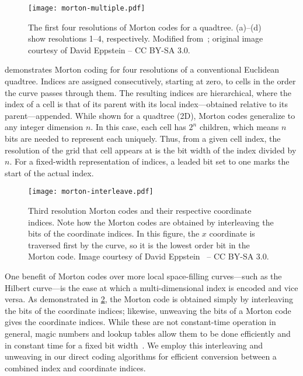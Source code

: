 \begin{figure}[ht!]
	\centering
	\texttt{[image: morton-multiple.pdf]}
	\caption[Four resolutions of Morton codes]{
		The first four resolutions of Morton codes for a quadtree.
		(a)--(d) show resolutions 1--4, respectively.
		Modified from~\cite{morton-multiple}; original image courtesy of David Eppstein -- CC BY-SA 3.0.
	}
	\label{fig:morton-multiple}
\end{figure}


 demonstrates Morton coding for four resolutions of a conventional Euclidean quadtree.
Indices are assigned consecutively, starting at zero, to cells in the order the curve passes through them.
The resulting indices are hierarchical, where the index of a cell is that of its parent with its local index---obtained relative to its parent---appended.
While shown for a quadtree (2D), Morton codes generalize to any integer dimension $n$.
In this case, each cell has $2^n$ children, which means $n$ bits are needed to represent each uniquely.
Thus, from a given cell index, the resolution of the grid that cell appears at is the bit width of the index divided by $n$.
For a fixed-width representation of indices, a leaded bit set to one marks the start of the actual index.


\begin{figure}[htp!]
	\centering
	\texttt{[image: morton-interleave.pdf]}
	\caption[Morton codes by bit-interleaving]{
		Third resolution Morton codes and their respective coordinate indices.
		Note how the Morton codes are obtained by interleaving the bits of the coordinate indices.
		In this figure, the $x$ coordinate is traversed first by the curve, so it is the lowest order bit in the Morton code.
		Image courtesy of David Eppstein~\cite{morton-interleave} -- CC BY-SA 3.0.
	}
	\label{fig:morton-interleave}
\end{figure}


One benefit of Morton codes over more local space-filling curves---such as the Hilbert curve---is the ease at which a multi-dimensional index is encoded and vice versa.
As demonstrated in \cref{fig:morton-interleave}, the Morton code is obtained simply by interleaving the bits of the coordinate indices; likewise, unweaving the bits of a Morton code gives the coordinate indices.
While these are not constant-time operation in general, magic numbers and lookup tables allow them to be done efficiently and in constant time for a fixed bit width~\cite{libmorton18}.
We employ this interleaving and unweaving in our direct coding algorithms for efficient conversion between a combined index and coordinate indices.


